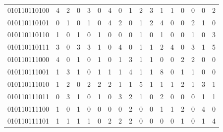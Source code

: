 \documentclass[10pt,a4paper]{article}
\begin{document}
\begin{longtable}{ |c|c|c|c|c|c|c|c|c|c|c|c|c|c|c|c|c| }
    010110110100              & 4                            & 2                                & 0                            & 3                              & 0   & 4   & 0   & 1   & 2   & 3   & 1   & 1   & 0   & 0   & 0   & 2   \\
    010110110101              & 0                            & 1                                & 0                            & 1                              & 0   & 4   & 2   & 0   & 1   & 2   & 4   & 0   & 0   & 2   & 1   & 0   \\
    010110110110              & 1                            & 0                                & 1                            & 0                              & 1   & 0   & 0   & 0   & 1   & 0   & 1   & 0   & 0   & 1   & 0   & 3   \\
    010110110111              & 3                            & 0                                & 3                            & 3                              & 1   & 0   & 4   & 0   & 1   & 1   & 2   & 4   & 0   & 3   & 1   & 5   \\
    010110111000              & 4                            & 0                                & 1                            & 0                              & 1   & 0   & 1   & 3   & 1   & 1   & 0   & 0   & 2   & 2   & 0   & 0   \\
    010110111001              & 1                            & 3                                & 1                            & 0                              & 1   & 1   & 1   & 4   & 1   & 1   & 8   & 0   & 1   & 1   & 0   & 0   \\
    010110111010              & 1                            & 2                                & 0                            & 2                              & 2   & 2   & 1   & 1   & 5   & 1   & 1   & 1   & 2   & 1   & 3   & 1   \\
    010110111011              & 0                            & 3                                & 1                            & 0                              & 1   & 0   & 3   & 2   & 1   & 0   & 2   & 0   & 0   & 0   & 1   & 1   \\
    010110111100              & 1                            & 0                                & 1                            & 0                              & 0   & 0   & 0   & 2   & 0   & 0   & 1   & 1   & 2   & 0   & 4   & 0   \\
    010110111101              & 1                            & 1                                & 1                            & 1                              & 0   & 2   & 2   & 2   & 0   & 0   & 0   & 0   & 1   & 0   & 1   & 4   \\

\end{longtable}
\end{document}
